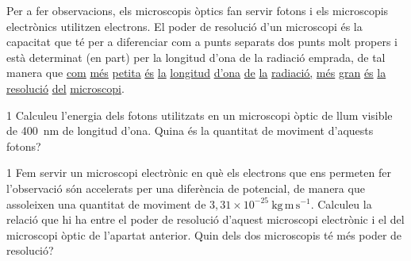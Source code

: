 Per a fer observacions, els microscopis òptics fan servir fotons i els microscopis electrònics utilitzen electrons. El poder de resolució d'un microscopi és la capacitat que té per a diferenciar com a punts separats dos punts molt propers i està determinat (en part) per la longitud d'ona de la radiació emprada, de tal manera que \underline{com} \underline{més} \underline{petita} \underline{és} \underline{la} \underline{longitud} \underline{d'ona} \underline{de} \underline{la} \underline{radiació,} \underline{més} \underline{gran} \underline{és} \underline{la} \underline{resolució} \underline{del} \underline{microscopi}.


\begin{apartat}{1}
Calculeu l'energia dels fotons utilitzats en un microscopi òptic de llum visible de 400~nm de longitud d'ona. Quina és la quantitat de moviment d'aquests fotons?
\end{apartat}

\begin{apartat}{1}
Fem servir un microscopi electrònic en què els electrons que ens permeten fer l'observació són accelerats per una diferència de potencial, de manera que assoleixen una quantitat de moviment de $3,31\times 10^{-25}\ \mathrm{kg\,m\,s^{-1}}$. Calculeu la relació que hi ha entre el poder de resolució d'aquest microscopi electrònic i el del microscopi òptic de l'apartat anterior. Quin dels dos microscopis té més poder de resolució?
\end{apartat}


